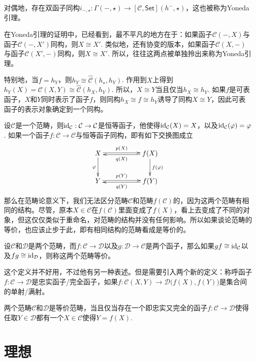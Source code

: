 \pro 对偶地，存在双函子同构$i_{-,\star}:\Gamma(-,\star)\to [\mathcal{C},\mathsf{Set}](h^-,\star)$，这也被称为Yoneda引理。

在Yoneda引理的证明中，已经看到，最不平凡的地方在于：如果函子$\mathcal{C}(-,X)$与函子$\mathcal{C}(-,X')$同构，则$X\cong X'$. 类似地，还有协变的版本，如果函子$\mathcal{C}(X,-)$与函子$\mathcal{C}(X',-)$同构，则$X\cong X'$. 所以，往往这两点被单独拎出来称为Yoneda引理。

\para 特别地，当$f=h_Y$，则$h_Y\cong {\hat{\mathcal{C}}}(h_\star,h_Y)$. 作用到$X$上得到$h_Y(X)={\mathcal{C}}(X,Y)\cong {\hat{\mathcal{C}}}(h_X,h_Y)$. 所以，$X\cong Y$当且仅当$h_X\cong h_Y$. 如果$f$是可表函子，$X$和$Y$同时表示了函子$f$，则同构$h_X\cong f \cong h_Y$诱导了同构$X\cong Y$，因此可表函子的表示对象确定到一个同构。 

\para 设$\mathcal{C}$是一个范畴，则$\operatorname{id}_\mathcal{C}:\mathcal{C}\to \mathcal{C}$是恒等函子，他使得$\operatorname{id}_\mathcal{C}(X)=X$，以及$\operatorname{id}_\mathcal{C}(\varphi)=\varphi$. 如果一个函子$f:\mathcal{C}\to\mathcal{C}$与恒等函子同构，即有如下交换图成立
\[
\begin{xy}
	\xymatrix{
		X\ar@<0.3ex>[rr]^-{p(X)} \ar[d]_{\varphi}&&f(X) \ar[d]^{f(\varphi)}\ar@<0.3ex>[ll]^-{q(X)}\\
		Y\ar@<0.3ex>[rr]^-{p(Y)}&&f(Y)\ar@<0.3ex>[ll]^-{q(Y)}
	}
\end{xy}
\]
那么在范畴论意义下，我们无法区分范畴$\mathcal{C}$和范畴$f(\mathcal{C})$的，因为这两个范畴有相同的结构。尽管，原本$X\in \mathcal{C}$在$f(\mathcal{C})$里面变成了$f(X)$，看上去变成了不同的对象，但这仅仅类似于重命名，对范畴的结构并没有任何影响。所以如果谈论范畴的等价，也应该止步于此，即有相同结构的范畴看成是等价的。

设$\mathcal{C}$和$\mathcal{D}$是两个范畴，而$f:\mathcal{C}\to \mathcal{D}$以及$g:\mathcal{D}\to \mathcal{C}$是两个函子，那么如果$gf\cong \operatorname{id}_\mathcal{C}$以及$fg\cong \operatorname{id}_\mathcal{D}$，则称这两个范畴等价。

这个定义并不好用，不过他有另一种表述。但是需要引入两个新的定义：称呼函子$f:\mathcal{C}\to \mathcal{D}$是忠实函子/完全函子，如果$f:\mathcal{C}(X,Y)\to \mathcal{D}\bigl(f(X),f(Y)\bigr)$是集合间的单射/满射。

\pro \label{equivcat}两个范畴$\mathcal{C}$和$\mathcal{D}$是等价范畴，当且仅当存在一个即忠实又完全的函子$f:\mathcal{C}\to \mathcal{D}$使得任取$Y\in\mathcal{D}$都有一个$X\in \mathcal{C}$使得$Y=f(X)$.\notprove

\section{理想}

